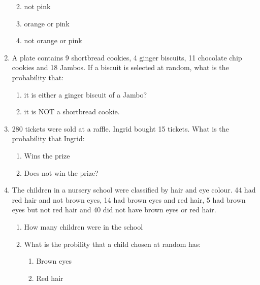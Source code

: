 \begin{enumerate}[noitemsep, label=\textbf{\arabic*}. ]
\begin{enumerate}[noitemsep, label=\textbf{\alph*}. ]
%     
\label{m39373*uid122}\item not pink
\label{m39373*uid123}\item orange or pink
\label{m39373*uid124}\item not orange or pink
\end{enumerate}
                \label{m39373*uid125}\item A plate contains 9 shortbread cookies, 4 ginger
biscuits, 11 chocolate chip cookies and 18 Jambos. If a biscuit is selected at
random, what is the probability that:
\label{m39373*id116177}\begin{enumerate}[noitemsep, label=\textbf{\alph*}. ] 
            \label{m39373*uid126}\item it is either a ginger biscuit of a
Jambo?
\label{m39373*uid127}\item it is NOT a shortbread cookie.
\end{enumerate}
                \label{m39373*uid128}\item 280 tickets were sold at a raffle. Ingrid bought 15
tickets. What is the probability that Ingrid:
\label{m39373*id116219}\begin{enumerate}[noitemsep, label=\textbf{\alph*}. ] 
            \label{m39373*uid129}\item Wins the prize
\label{m39373*uid130}\item Does not win the prize?
\end{enumerate}
                \label{m39373*uid131}\item The children in a nursery school were classified by
hair and eye colour. 44 had red hair and not brown eyes, 14 had brown eyes and
red hair, 5 had brown eyes but not red hair and 40 did not have brown eyes or
red hair.
\label{m39373*id116261}\begin{enumerate}[noitemsep, label=\textbf{\alph*}. ] 
            \label{m39373*uid132}\item How many children were in the
school
\label{m39373*uid133}\item What is the probility that a child chosen at random
has:
\label{m39373*id116289}\begin{enumerate}[noitemsep, label=\textbf{\arabic*}. ] 
            \label{m39373*uid134}\item Brown eyes
\label{m39373*uid135}\item Red hair

\end{enumerate}
\end{enumerate}
\end{enumerate}
